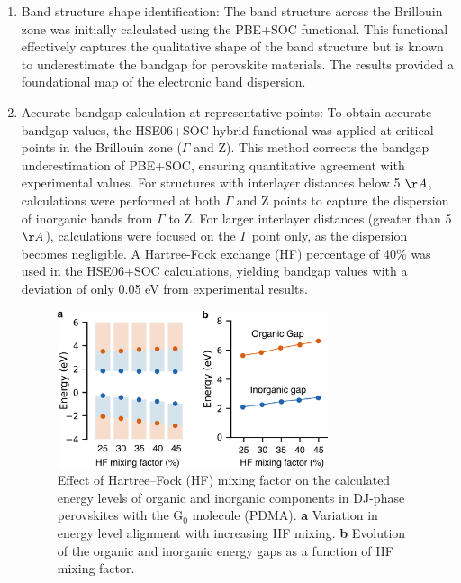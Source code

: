 \begin{enumerate}
    \item Band structure shape identification: The band structure across the Brillouin zone was initially calculated using the PBE+SOC functional. This functional effectively captures the qualitative shape of the band structure but is known to underestimate the bandgap for perovskite materials. The results provided a foundational map of the electronic band dispersion. 

    \item Accurate bandgap calculation at representative points: To obtain accurate bandgap values, the HSE06+SOC hybrid functional was applied at critical points in the Brillouin zone ($\Gamma$ and Z). This method corrects the bandgap underestimation of PBE+SOC, ensuring quantitative agreement with experimental values. For structures with interlayer distances below 5 $\AA$, calculations were performed at both $\Gamma$ and Z points to capture the dispersion of inorganic bands from $\Gamma$ to Z. For larger interlayer distances (greater than 5 $\AA$), calculations were focused on the $\Gamma$ point only, as the dispersion becomes negligible. A Hartree-Fock exchange (HF) percentage of 40\% was used in the HSE06+SOC calculations, yielding bandgap values with a deviation of only 0.05 eV from experimental results. 

\begin{figure}[ht]
    \centering
    \includegraphics[width=0.75\textwidth]{figures/methodology/figure3-11.png}
    \caption[Effect of Hartree–Fock (HF) mixing factor on the calculated energy levels of organic and inorganic components in DJ-phase perovskites with the G$_0$ molecule (PDMA).]{Effect of Hartree–Fock (HF) mixing factor on the calculated energy levels of organic and inorganic components in DJ-phase perovskites with the G$_0$ molecule (PDMA). \textbf{a} Variation in energy level alignment with increasing HF mixing. \textbf{b} Evolution of the organic and inorganic energy gaps as a function of HF mixing factor.}
    \label{fig:figure3.11}
\end{figure}


\end{enumerate}

